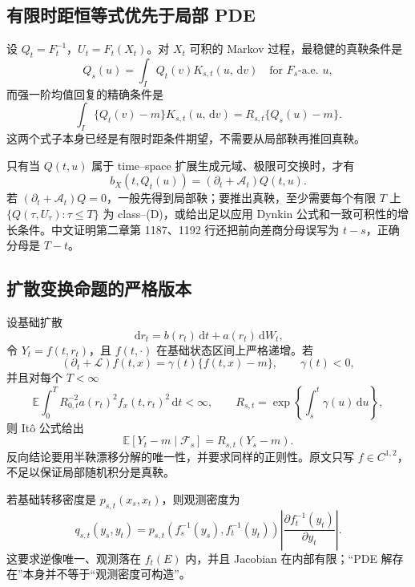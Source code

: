 \documentclass[UTF8,11pt]{ctexart}
\newcommand{\E}{\mathbb E}
\newcommand{\dd}{\,\mathrm d}
\begin{document}
\subsection{有限时距恒等式优先于局部 PDE}

设 $Q_t=F_t^{-1}$，$U_t=F_t(X_t)$。对 $X_t$ 可积的 Markov 过程，最稳健的真鞅条件是
\begin{equation}
Q_s(u)=\int_I Q_t(v)K_{s,t}(u,\dd v)
\quad\text{for }F_s\text{-a.e. }u,\label{cmp:exact-mg}
\end{equation}
而强一阶均值回复的精确条件是
\begin{equation}
\int_I\{Q_t(v)-m\}K_{s,t}(u,\dd v)
=R_{s,t}\{Q_s(u)-m\}.\label{cmp:exact-mr}
\end{equation}
这两个式子本身已经是有限时距条件期望，不需要从局部鞅再推回真鞅。

只有当 $Q(t,u)$ 属于 time--space 扩展生成元域、极限可交换时，才有
\begin{equation}
b_X(t,Q_t(u))=(\partial_t+\mathcal A_t)Q(t,u).\label{cmp:forward-generator}
\end{equation}
若 $(\partial_t+\mathcal A_t)Q=0$，一般先得到局部鞅；要推出真鞅，至少需要每个有限 $T$ 上
$\{Q(\tau,U_\tau):\tau\le T\}$ 为 class--(D)，或给出足以应用 Dynkin 公式和一致可积性的增长条件。中文证明第二章第 1187、1192 行还把前向差商分母误写为 $t-s$，正确分母是 $T-t$。

\subsection{扩散变换命题的严格版本}

设基础扩散
\[
\dd r_t=b(r_t)\dd t+a(r_t)\dd W_t,
\]
令 $Y_t=f(t,r_t)$，且 $f(t,\cdot)$ 在基础状态区间上严格递增。若
\begin{equation}
(\partial_t+\mathcal L)f(t,x)=\gamma(t)\{f(t,x)-m\},
\qquad \gamma(t)<0,\label{cmp:transform-pde}
\end{equation}
并且对每个 $T<\infty$
\begin{equation}
\E\int_0^T R_{0,t}^{-2}a(r_t)^2f_x(t,r_t)^2\dd t<\infty,
\qquad
R_{s,t}=\exp\!\left\{\int_s^t\gamma(u)\dd u\right\},\label{cmp:square-int}
\end{equation}
则 It\^o 公式给出
\[
\E[Y_t-m\mid\mathcal F_s]=R_{s,t}(Y_s-m).
\]
反向结论要用半鞅漂移分解的唯一性，并要求同样的正则性。原文只写 $f\in C^{1,2}$，不足以保证局部随机积分是真鞅。

若基础转移密度是 $p_{s,t}(x_s,x_t)$，则观测密度为
\begin{equation}
q_{s,t}(y_s,y_t)=p_{s,t}\!\left(f_s^{-1}(y_s),f_t^{-1}(y_t)\right)
\left|\frac{\partial f_t^{-1}(y_t)}{\partial y_t}\right|.\label{cmp:jacobian}
\end{equation}
这要求逆像唯一、观测落在 $f_t(E)$ 内，并且 Jacobian 在内部有限；“PDE 解存在”本身并不等于“观测密度可构造”。
\end{document}
